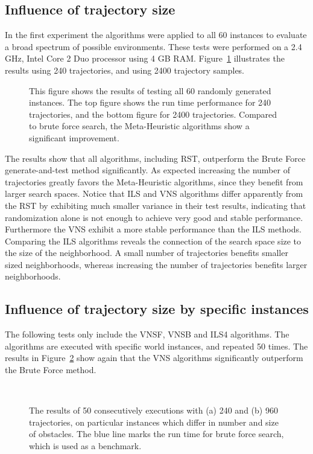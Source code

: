 \subsection{Influence of trajectory size}
In the first experiment the algorithms were applied to all 60 instances to evaluate a broad spectrum of possible environments. These tests were performed on a 2.4 GHz, Intel Core 2 Duo processor using 4 GB RAM.  
Figure~\ref{fig:fig_allworlds} illustrates the results using 240 trajectories, and using 2400 trajectory samples.
   \begin{figure}[thpb]
        \footnotesize
      \centering
      \def\svgwidth{\textwidth}
      
      \caption{This figure shows the results of testing all 60 randomly generated instances. The top figure shows the run time performance for 240 trajectories, and the bottom figure for 2400 trajectories. Compared to brute force search, the Meta-Heuristic algorithms show a significant improvement. }
      \label{fig:fig_allworlds}
   \end{figure}

 
The results show that all algorithms, including RST, outperform the Brute Force generate-and-test method significantly. 
As expected increasing the number of trajectories greatly favors the Meta-Heuristic algorithms, since they benefit from larger search spaces. 
Notice that ILS and VNS algorithms differ apparently from the RST by exhibiting much smaller variance in their test results, indicating that randomization alone is not enough to achieve very good and stable performance.
Furthermore the VNS exhibit a more stable performance than the ILS methods. 
Comparing the ILS algorithms reveals the connection of the search space size to the size of the neighborhood. 
A small number of trajectories benefits smaller sized neighborhoods, whereas increasing the number of trajectories benefits larger neighborhoods. 

\subsection{Influence of trajectory size by specific instances}
The following tests only include the VNSF, VNSB and ILS4 algorithms. 
The algorithms are executed with specific world instances, and repeated 50 times. 
The results in Figure~\ref{fig:fig_special} show again that the VNS algorithms significantly outperform the Brute Force method. 

\begin{figure}[thb]
   \myfloatalign
    \subfloat[]
    {  
       \def\svgwidth{\textwidth}
       
    }\\
    \subfloat[]
    {  
       \def\svgwidth{\textwidth}
       
    }
    \caption[Experiment: Trajectory size comparison]{The results of 50 consecutively executions with (a) 240 and (b) 960 trajectories, on particular instances which differ in number and size of obstacles. The blue line marks the run time for brute force search, which is used as a benchmark.}  
     \label{fig:fig_special}
\end{figure}
   

